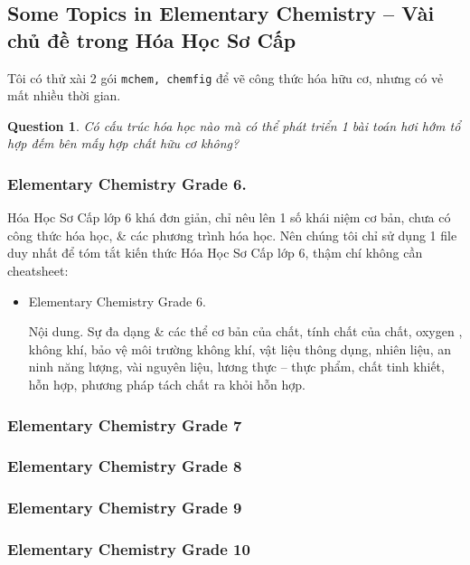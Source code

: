 \documentclass[12pt,oneside]{book}
\newtheorem{question}{Question}
\begin{document}

\subsection{Some Topics in Elementary Chemistry -- Vài chủ đề trong Hóa Học Sơ Cấp}
Tôi có thử xài 2 gói {\tt mchem, chemfig} để vẽ công thức hóa hữu cơ, nhưng có vẻ mất nhiều thời gian.

\begin{question}
	Có cấu trúc hóa học nào mà có thể phát triển 1 bài toán hơi hớm tổ hợp đếm bên mấy hợp chất hữu cơ không?
\end{question}

\subsubsection{Elementary Chemistry Grade 6.} Hóa Học Sơ Cấp lớp 6 khá đơn giản, chỉ nêu lên 1 số khái niệm cơ bản, chưa có công thức hóa học, \& các phương trình hóa học. Nên chúng tôi chỉ sử dụng 1 file duy nhất để tóm tắt kiến thức Hóa Học Sơ Cấp lớp 6, thậm chí không cần cheatsheet:
\begin{itemize}
	\item Elementary Chemistry Grade 6.
	
	{\sf Nội dung.} Sự đa dạng \& các thể cơ bản của chất, tính chất của chất, oxygen , không khí, bảo vệ môi trường không khí, vật liệu thông dụng, nhiên liệu, an ninh năng lượng, vài nguyên liệu, lương thực -- thực phẩm, chất tinh khiết, hỗn hợp, phương pháp tách chất ra khỏi hỗn hợp.
\end{itemize}

\subsubsection{Elementary Chemistry Grade 7}

\subsubsection{Elementary Chemistry Grade 8}

\subsubsection{Elementary Chemistry Grade 9}

\subsubsection{Elementary Chemistry Grade 10}
\end{document}
